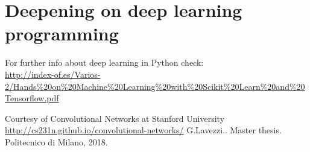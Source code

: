 \documentclass[11pt]{article}
\begin{document}
\section{Deepening on deep learning programming }
For further info about  deep learning in Python check:\\ \url{http://index-of.es/Varios-2/Hands\%20on\%20Machine\%20Learning\%20with\%20Scikit\%20Learn\%20and\%20Tensorflow.pdf}
\clearpage

\begin{flushleft}
\begin{thebibliography}{99}

     \makeatletter
    \renewcommand\@biblabel[1]{[RD-#1.]}
    \makeatother

Courtesy of  Convolutional Networks at Stanford University \hspace{0.02cm}
\url{http://cs231n.github.io/convolutional-networks/}
G.Lavezzi.. Master thesis. Politecnico di Milano, 2018.
\end{thebibliography}
\end{flushleft}
\end{document}

